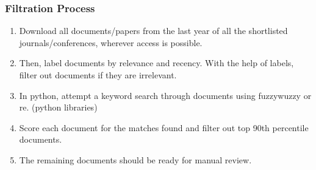 \documentclass[
	11pt, %
]{beamer}
\begin{document}
\begin{frame}
	\frametitle{Filtration Process}
    

	
	\bigskip %
	
	\begin{enumerate}
		\item Download all documents/papers from the last year of all the shortlisted journals/conferences, wherever access is possible.
  
		\bigskip %
	    \item Then, label documents by relevance and recency. With the help of labels, filter out documents if they are irrelevant.
     
		\bigskip %
	    \item In python, attempt a keyword search through documents using fuzzywuzzy or re. (python libraries)
     
        \bigskip %
        \item Score each document for the matches found and filter out top 90th percentile documents.

        \bigskip %
        \item The remaining documents should be ready for manual review.

	\end{enumerate}
\end{frame}

\end{document}
